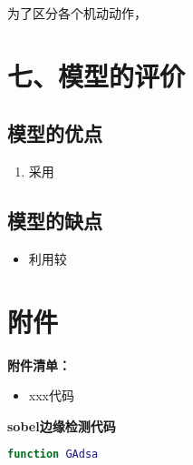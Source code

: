 \documentclass{my_paper}
\begin{document}
为了区分各个机动动作，
\section{七、模型的评价}

\subsection{模型的优点}
\begin{enumerate}
    \item 采用

\end{enumerate}

\subsection{模型的缺点}
\begin{itemize}
    \item 利用较

\end{itemize}

\newpage
\begin{center}
\end{center}

\newpage
\section{附件}
\textbf{附件清单：}
\begin{itemize}
    \item xxx代码
\end{itemize}

\textbf{sobel边缘检测代码}

\begin{lstlisting}[language=matlab]
    function GAdsa 
\end{lstlisting}
\end{document}
